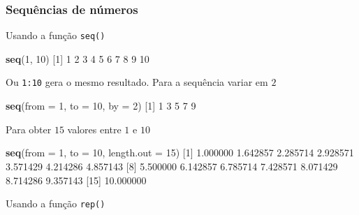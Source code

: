 \documentclass[10pt,a4paper]{book}
\newenvironment{Shaded}{\begin{snugshade}}{\end{snugshade}}
\newcommand{\KeywordTok}[1]{\textcolor[rgb]{0.13,0.29,0.53}{\textbf{#1}}}
\newcommand{\DataTypeTok}[1]{\textcolor[rgb]{0.13,0.29,0.53}{#1}}
\newcommand{\DecValTok}[1]{\textcolor[rgb]{0.00,0.00,0.81}{#1}}
\newcommand{\FloatTok}[1]{\textcolor[rgb]{0.00,0.00,0.81}{#1}}
\newcommand{\NormalTok}[1]{#1}
\begin{document}
\subsubsection{Sequências de números}\label{sequencias-de-numeros}

Usando a função \texttt{seq()}

\begin{Shaded}
\begin{Highlighting}[]
\KeywordTok{seq}\NormalTok{(}\DecValTok{1}\NormalTok{, }\DecValTok{10}\NormalTok{)}
\NormalTok{ [}\DecValTok{1}\NormalTok{]  }\DecValTok{1}  \DecValTok{2}  \DecValTok{3}  \DecValTok{4}  \DecValTok{5}  \DecValTok{6}  \DecValTok{7}  \DecValTok{8}  \DecValTok{9} \DecValTok{10}
\end{Highlighting}
\end{Shaded}

Ou \texttt{1:10} gera o mesmo resultado. Para a sequência variar em
\(2\)

\begin{Shaded}
\begin{Highlighting}[]
\KeywordTok{seq}\NormalTok{(}\DataTypeTok{from =} \DecValTok{1}\NormalTok{, }\DataTypeTok{to =} \DecValTok{10}\NormalTok{, }\DataTypeTok{by =} \DecValTok{2}\NormalTok{)}
\NormalTok{[}\DecValTok{1}\NormalTok{] }\DecValTok{1} \DecValTok{3} \DecValTok{5} \DecValTok{7} \DecValTok{9}
\end{Highlighting}
\end{Shaded}

Para obter \(15\) valores entre \(1\) e \(10\)

\begin{Shaded}
\begin{Highlighting}[]
\KeywordTok{seq}\NormalTok{(}\DataTypeTok{from =} \DecValTok{1}\NormalTok{, }\DataTypeTok{to =} \DecValTok{10}\NormalTok{, }\DataTypeTok{length.out =} \DecValTok{15}\NormalTok{)}
\NormalTok{ [}\DecValTok{1}\NormalTok{]  }\FloatTok{1.000000}  \FloatTok{1.642857}  \FloatTok{2.285714}  \FloatTok{2.928571}  \FloatTok{3.571429}  \FloatTok{4.214286}  \FloatTok{4.857143}
\NormalTok{ [}\DecValTok{8}\NormalTok{]  }\FloatTok{5.500000}  \FloatTok{6.142857}  \FloatTok{6.785714}  \FloatTok{7.428571}  \FloatTok{8.071429}  \FloatTok{8.714286}  \FloatTok{9.357143}
\NormalTok{[}\DecValTok{15}\NormalTok{] }\FloatTok{10.000000}
\end{Highlighting}
\end{Shaded}

Usando a função \texttt{rep()}
\end{document}
